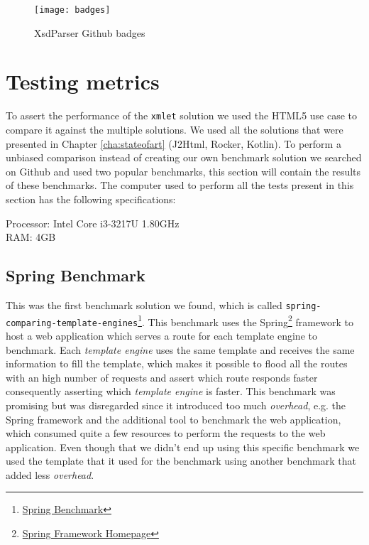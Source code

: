 \begin{figure}[h]
	\centering
	\texttt{[image: badges]}
	\caption{XsdParser Github badges}
	\label{project_badges}
\end{figure}

\section{Testing metrics} %
\label{sec:testingmetrics}

To assert the performance of the \texttt{xmlet} solution we used the \ac{HTML}5 use case to compare it against the multiple solutions. We used all the solutions that were presented in Chapter \ref{cha:stateofart} (J2Html, Rocker, Kotlin). To perform a unbiased comparison instead of creating our own benchmark solution we searched on Github and used two popular benchmarks, this section will contain the results of these benchmarks. The computer used to perform all the tests present in this section has the following specifications:

Processor: Intel Core i3-3217U 1.80GHz\\
RAM: 4GB

\subsection{Spring Benchmark}
\label{sec:springbenchmark}

This was the first benchmark solution we found, which is called \texttt{spring-comparing-template-engines}\footnote{\href{https://github.com/jreijn/spring-comparing-template-engines}{Spring Benchmark}}. This benchmark uses the Spring\footnote{\href{http://spring.io/}{Spring Framework Homepage}} framework to host a web application which serves a route for each template engine to benchmark. Each \textit{template engine} uses the same template and receives the same information to fill the template, which makes it possible to flood all the routes with an high number of requests and assert which route responds faster consequently asserting which \textit{template engine} is faster. This benchmark was promising but was disregarded since it introduced too much \textit{overhead}, e.g. the Spring framework and the additional tool to benchmark the web application, which consumed quite a few resources to perform the requests to the web application. Even though that we didn't end up using this specific benchmark we used the template that it used for the benchmark using another benchmark that added less \textit{overhead}.

